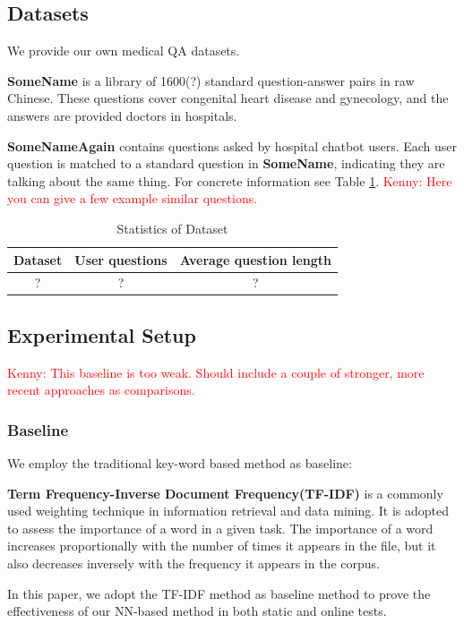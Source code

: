 \documentclass[a4paper,10pt]{article}
\newcommand{\KZ}[1]{\textcolor{red}{Kenny: #1}}
\begin{document}
\subsection{Datasets}
\par We provide our own medical QA datasets.
\par \textbf{SomeName} is a library of 1600(?) standard question-answer pairs in raw Chinese. These questions cover congenital heart disease and gynecology, and the answers are provided doctors in hospitals.
\par \textbf{SomeNameAgain} contains questions asked by hospital chatbot users. Each user question is matched to a standard question in \textbf{SomeName}, indicating they are talking about the same thing. For concrete information see Table \ref{dataset}.
\KZ{Here you can give a few example similar questions.} 
\begin{table}[]
    \centering
\begin{tabular}{c|c|c}
    \toprule[1pt]
     Dataset & User questions & Average question length \\ \hline
     ?&?&? \\
     \bottomrule[1pt]
    \end{tabular}
    \caption{Statistics of Dataset}
    \label{dataset}
\end{table}

\subsection{Experimental Setup}
\KZ{This baseline is too weak. Should include a couple of stronger,
more recent approaches as comparisons.}
\subsubsection{Baseline}
\par We employ the traditional key-word based method as baseline:
\par \textbf{Term Frequency-Inverse Document Frequency(TF-IDF)} is a commonly used weighting technique in information retrieval and data mining. It is adopted to assess the importance of a word in a given task. The importance of a word increases proportionally with the number of times it appears in the file, but it also decreases inversely with the frequency it appears in the corpus.
\par In this paper, we adopt the TF-IDF method as baseline method to prove the effectiveness of our NN-based method in both static and online tests.
\end{document}
